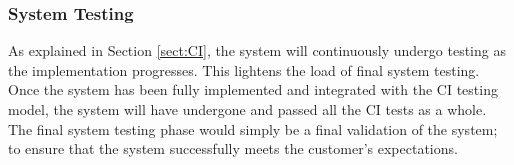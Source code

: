 \subsubsection{System Testing}
As explained in Section \ref{sect:CI}, the system will continuously undergo testing as the implementation progresses. This lightens the load of final system testing. Once the system has been fully implemented and integrated with the CI testing model, the system will have undergone and passed all the CI tests as a whole. The final system testing phase would simply be a final validation of the system; to ensure that the system successfully meets the customer's expectations. 